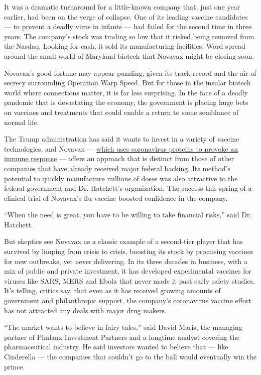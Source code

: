 It was a dramatic turnaround for a little-known company that, just one
year earlier, had been on the verge of collapse. One of its leading
vaccine candidates --- to prevent a deadly virus in infants --- had
failed for the second time in three years. The company's stock was
trading so low that it risked being removed from the Nasdaq. Looking for
cash, it sold its manufacturing facilities. Word spread around the small
world of Maryland biotech that Novavax might be closing soon.

Novavax's good fortune may appear puzzling, given its track record and
the air of secrecy surrounding Operation Warp Speed. But for those in
the insular biotech world where connections matter, it is far less
surprising. In the face of a deadly pandemic that is devastating the
economy, the government is placing huge bets on vaccines and treatments
that could enable a return to some semblance of normal life.

The Trump administration has said it wants to invest in a variety of
vaccine technologies, and Novavax ---
\href{https://www.nytimes3xbfgragh.onion/interactive/2020/05/20/science/coronavirus-vaccine-development.html}{which
uses coronavirus proteins to provoke an immune response} --- offers an
approach that is distinct from those of other companies that have
already received major federal backing. Its method's potential to
quickly manufacture millions of doses was also attractive to the federal
government and Dr. Hatchett's organization. The success this spring of a
clinical trial of Novavax's flu vaccine boosted confidence in the
company.

``When the need is great, you have to be willing to take financial
risks,'' said Dr. Hatchett.

But skeptics see Novavax as a classic example of a second-tier player
that has survived by limping from crisis to crisis, boosting its stock
by promising vaccines for new outbreaks, yet never delivering. In its
three decades in business, with a mix of public and private investment,
it has developed experimental vaccines for viruses like SARS, MERS and
Ebola that never made it past early safety studies. It's telling,
critics say, that even as it has received growing amounts of government
and philanthropic support, the company's coronavirus vaccine effort has
not attracted any deals with major drug makers.

``The market wants to believe in fairy tales,'' said David Maris, the
managing partner of Phalanx Investment Partners and a longtime analyst
covering the pharmaceutical industry. He said investors wanted to
believe that --- like Cinderella --- the companies that couldn't go to
the ball would eventually win the prince.

